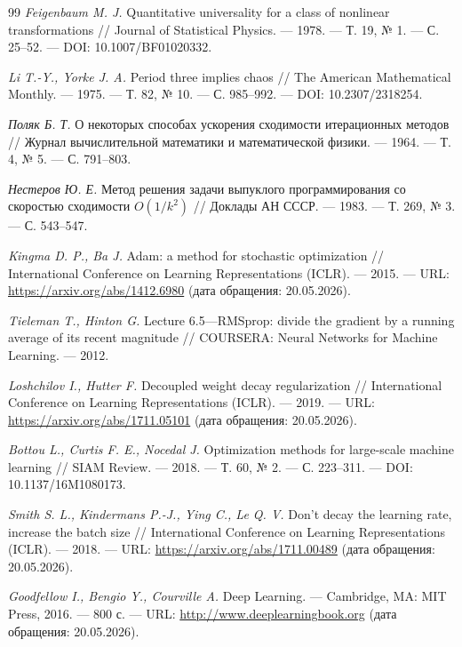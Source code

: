 \begin{thebibliography}{99}
\emph{Feigenbaum M. J.} Quantitative universality for a class of nonlinear
transformations // Journal of Statistical Physics. --- 1978. --- Т. 19,
№ 1. --- С. 25--52. --- DOI: 10.1007/BF01020332.

\emph{Li T.-Y., Yorke J. A.} Period three implies chaos // The American
Mathematical Monthly. --- 1975. --- Т. 82, № 10. --- С. 985--992. ---
DOI: 10.2307/2318254.

\emph{Поляк Б. Т.} О некоторых способах ускорения сходимости итерационных
методов // Журнал вычислительной математики и математической физики. ---
1964. --- Т. 4, № 5. --- С. 791--803.

\emph{Нестеров Ю. Е.} Метод решения задачи выпуклого программирования со
скоростью сходимости $O(1/k^2)$ // Доклады АН СССР. --- 1983. --- Т. 269,
№ 3. --- С. 543--547.

\emph{Kingma D. P., Ba J.} Adam: a method for stochastic optimization //
International Conference on Learning Representations (ICLR). --- 2015. --- URL:
\url{https://arxiv.org/abs/1412.6980} (дата обращения: 20.05.2026).

\emph{Tieleman T., Hinton G.} Lecture 6.5---RMSprop: divide the gradient by a
running average of its recent magnitude // COURSERA: Neural Networks for
Machine Learning. --- 2012.

\emph{Loshchilov I., Hutter F.} Decoupled weight decay regularization //
International Conference on Learning Representations (ICLR). --- 2019. --- URL:
\url{https://arxiv.org/abs/1711.05101} (дата обращения: 20.05.2026).

\emph{Bottou L., Curtis F. E., Nocedal J.} Optimization methods for large-scale
machine learning // SIAM Review. --- 2018. --- Т. 60, № 2. --- С. 223--311. ---
DOI: 10.1137/16M1080173.

\emph{Smith S. L., Kindermans P.-J., Ying C., Le Q. V.} Don't decay the learning
rate, increase the batch size // International Conference on Learning
Representations (ICLR). --- 2018. --- URL:
\url{https://arxiv.org/abs/1711.00489} (дата обращения: 20.05.2026).

\emph{Goodfellow I., Bengio Y., Courville A.} Deep Learning. --- Cambridge, MA:
MIT Press, 2016. --- 800 с. --- URL: \url{http://www.deeplearningbook.org}
(дата обращения: 20.05.2026).


\end{thebibliography}
